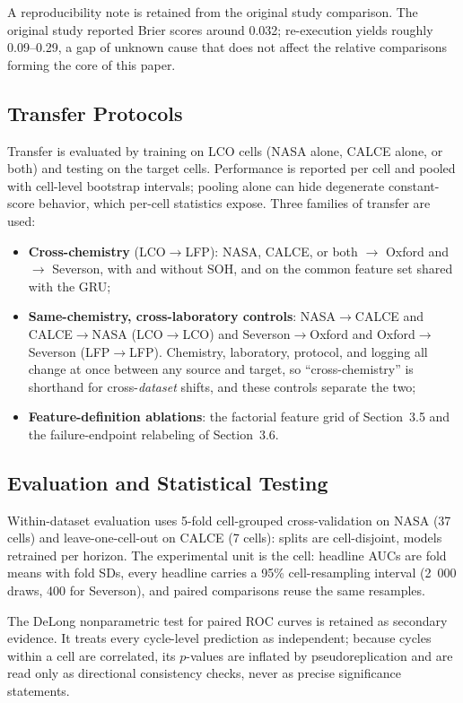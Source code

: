 \documentclass[preprint,12pt]{elsarticle}
\begin{document}
A reproducibility note is retained from the original study comparison. The original study \cite{shikdar2026learning} reported Brier scores around 0.032; re-execution yields roughly 0.09--0.29, a gap of unknown cause that does not affect the relative comparisons forming the core of this paper.

\subsection{Transfer Protocols}
Transfer is evaluated by training on LCO cells (NASA alone, CALCE alone, or both) and testing on the target cells. Performance is reported per cell and pooled with cell-level bootstrap intervals; pooling alone can hide degenerate constant-score behavior, which per-cell statistics expose. Three families of transfer are used:

\begin{itemize}
\item \textbf{Cross-chemistry} (LCO$\to$LFP): NASA, CALCE, or both $\to$ Oxford and $\to$ Severson, with and without SOH, and on the common feature set shared with the GRU;
\item \textbf{Same-chemistry, cross-laboratory controls}: NASA$\to$CALCE and CALCE$\to$NASA (LCO$\to$LCO) and Severson$\to$Oxford and Oxford$\to$Severson (LFP$\to$LFP). Chemistry, laboratory, protocol, and logging all change at once between any source and target, so ``cross-chemistry'' is shorthand for cross-\emph{dataset} shifts, and these controls separate the two;
\item \textbf{Feature-definition ablations}: the factorial feature grid of Section~3.5 and the failure-endpoint relabeling of Section~3.6.
\end{itemize}

\subsection{Evaluation and Statistical Testing}
\label{sec:eval}
Within-dataset evaluation uses 5-fold cell-grouped cross-validation on NASA (37 cells) and leave-one-cell-out on CALCE (7 cells): splits are cell-disjoint, models retrained per horizon. The experimental unit is the cell: headline AUCs are fold means with fold SDs, every headline carries a 95\% cell-resampling interval (2~000 draws, 400 for Severson), and paired comparisons reuse the same resamples.

The DeLong nonparametric test \cite{delong1988comparing} for paired ROC curves is retained as secondary evidence. It treats every cycle-level prediction as independent; because cycles within a cell are correlated, its $p$-values are inflated by pseudoreplication and are read only as directional consistency checks, never as precise significance statements.
\end{document}
